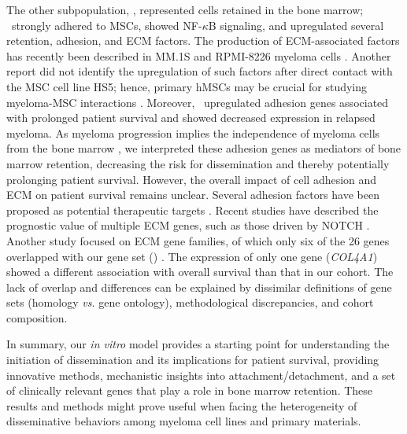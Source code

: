 The other subpopulation, \MAina, represented cells retained in the bone marrow; \linebreak
\MAina\ strongly adhered to MSCs, showed NF-$\kappa$B signaling, and upregulated
several retention, adhesion, and ECM factors. The production of ECM-associated
factors has recently been described in MM.1S and RPMI-8226 myeloma cells
\cite{maichlIdentificationNOTCHdrivenMatrisomeassociated2023}. Another report did not
identify the upregulation of such factors after direct contact with the MSC cell
line HS5; hence, primary hMSCs may be crucial for studying myeloma-MSC
interactions \cite{dziadowiczBoneMarrowStromaInduced2022}. Moreover, \MAina\ upregulated
adhesion genes associated with prolonged patient survival and showed decreased
expression in relapsed myeloma. As myeloma progression implies the independence
of myeloma cells from the bone marrow \cite{bladeExtramedullaryDiseaseMultiple2022,sarinEvaluatingEfficacyMultiple2020}, we interpreted these adhesion genes as
mediators of bone marrow retention, decreasing the risk for dissemination and
thereby potentially prolonging patient survival. However, the overall impact of
cell adhesion and ECM on patient survival remains unclear. Several adhesion
factors have been proposed as potential therapeutic targets
\cite{brandlJunctionalAdhesionMolecule2022, bouzerdanAdhesionMoleculesMultiple2022}. Recent studies
have described the prognostic value of multiple ECM genes, such as those driven
by NOTCH \cite{maichlIdentificationNOTCHdrivenMatrisomeassociated2023}. Another study focused
on ECM gene families, of which only six of the 26 genes overlapped with our gene
set () \cite{eversPrognosticValueExtracellular2023}. The
expression of only one gene (\textit{COL4A1}) showed a different association with overall
survival than that in our cohort. The lack of overlap and differences can be
explained by dissimilar definitions of gene sets (homology \textit{vs.} gene ontology),
methodological discrepancies, and cohort composition.

In summary, our \textit{in vitro} model provides a starting point for
understanding the initiation of dissemination and its implications for patient
survival, providing innovative methods, mechanistic insights into
attachment/detachment, and a set of clinically relevant genes that play a role
in bone marrow retention. These results and methods might prove useful when
facing the heterogeneity of disseminative behaviors among myeloma cell lines and
primary materials.



